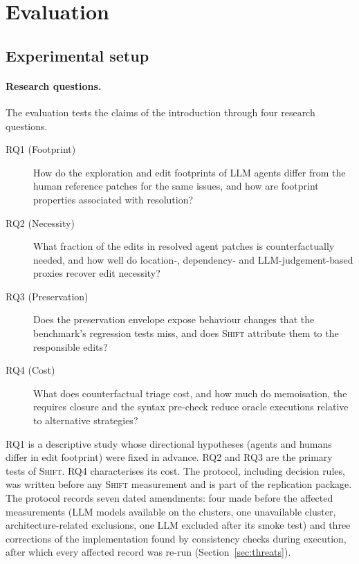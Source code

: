 \documentclass[a4paper,fleqn]{cas-sc}
\newcommand{\tool}{\textsc{Shift}}
\begin{document}
\section{Evaluation}\label{sec:evaluation}

\subsection{Experimental setup}\label{sec:setup}

\paragraph{Research questions.} The evaluation tests the claims of the introduction through four research questions.
\begin{description}
\item[RQ1 (Footprint)] How do the exploration and edit footprints of LLM agents differ from the human reference patches for the same issues, and how are footprint properties associated with resolution?
\item[RQ2 (Necessity)] What fraction of the edits in resolved agent patches is counterfactually needed, and how well do location-, dependency- and LLM-judgement-based proxies recover edit necessity?
\item[RQ3 (Preservation)] Does the preservation envelope expose behaviour changes that the benchmark's regression tests miss, and does \tool{} attribute them to the responsible edits?
\item[RQ4 (Cost)] What does counterfactual triage cost, and how much do memoisation, the requires closure and the syntax pre-check reduce oracle executions relative to alternative strategies?
\end{description}
RQ1 is a descriptive study whose directional hypotheses (agents and humans differ in edit footprint) were fixed in advance. RQ2 and RQ3 are the primary tests of \tool{}. RQ4 characterises its cost. The protocol, including decision rules, was written before any \tool{} measurement and is part of the replication package. The protocol records seven dated amendments: four made before the affected measurements (LLM models available on the clusters, one unavailable cluster, architecture-related exclusions, one LLM excluded after its smoke test) and three corrections of the implementation found by consistency checks during execution, after which every affected record was re-run (Section~\ref{sec:threats}).
\end{document}

